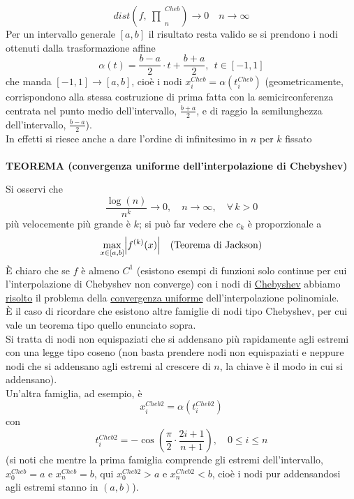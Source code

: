 \documentclass[12pt]{article}
\DeclarePairedDelimiter{\abs}{\lvert}{\rvert}
\newcommand{\inter}{\begin{matrix}\prod\end{matrix}}
\begin{document}
\[ dist(f,\inter_n^{Cheb})\rightarrow 0 \quad n\rightarrow\infty \]
Per un intervallo generale $[a,b]$ il risultato resta valido se si prendono i nodi ottenuti dalla trasformazione affine
\[ \alpha(t)=\frac{b-a}{2}\cdot t+\frac{b+a}{2},\ \ t\in[-1,1] \]
che manda $[-1,1] \rightarrow [a,b]$, cioè i nodi $x_i^{Cheb}=\alpha(t_i^{Cheb})$ (geometricamente, corrispondono alla stessa costruzione di prima fatta con la semicirconferenza centrata nel punto medio dell'intervallo, $\frac{b+a}{2}$, e di raggio la semilunghezza dell'intervallo, $\frac{b-a}{2}$).\\
In effetti si riesce anche a dare l'ordine di infinitesimo in $n$ per $k$ fissato\\
\\
\textbf{TEOREMA (convergenza uniforme dell'interpolazione di Chebyshev)}
\begin{center}
    \fbox{\begin{minipage}[t]{15cm}%
        Sia $f \in C^k[a,b], \, k > 0$, 
        allora 
        \[ \exists \, c_k>0 : dist \left(f, \inter_n^{Cheb} \right) \le c_k \frac{\log (n)}{n^k}\]
    \end{minipage}}
\end{center}
Si osservi che 
\[ \frac{\log (n)}{n^k} \to 0, \quad n \to \infty, \quad \forall \, k > 0 \]
più velocemente più grande è $k$; si può far vedere che $c_k$ è proporzionale a 
\[\max_{x \in [a,b]} \abs*{f^{(k)}(x)} \quad \text{(Teorema di Jackson)}\]
È chiaro che se $f$ è almeno $C^1$ (esistono esempi di funzioni solo continue per cui l'interpolazione di Chebyshev non converge) con i nodi di \underline{Chebyshev} abbiamo \underline{risolto} il problema della \underline{convergenza uniforme} dell'interpolazione polinomiale.\\
È il caso di ricordare che esistono altre famiglie di nodi tipo Chebyshev, per cui vale un teorema tipo quello enunciato sopra.\\
Si tratta di nodi non equispaziati che si addensano più rapidamente agli estremi con una legge tipo coseno (non basta prendere nodi non equispaziati e neppure nodi che si addensano agli estremi al crescere di $n$, la chiave è il modo in cui si addensano).\\
Un'altra famiglia, ad esempio, è
\[x_i^{Cheb2} = \alpha(t_i^{Cheb2})\] con
\[t_i^{Cheb2} = - \cos{\left(\frac{\pi}{2}\cdot \frac{2i+1}{n+1}\right)}, \quad 0 \le i \le n\]
(si noti che mentre la prima famiglia comprende gli estremi dell'intervallo, $x_0^{Cheb}=a$ e $x_n^{Cheb}=b$, qui $x_0^{Cheb2}>a$ e $x_n^{Cheb2}<b$, cioè i nodi pur addensandosi agli estremi stanno in $(a,b)$).\\
\end{document}
